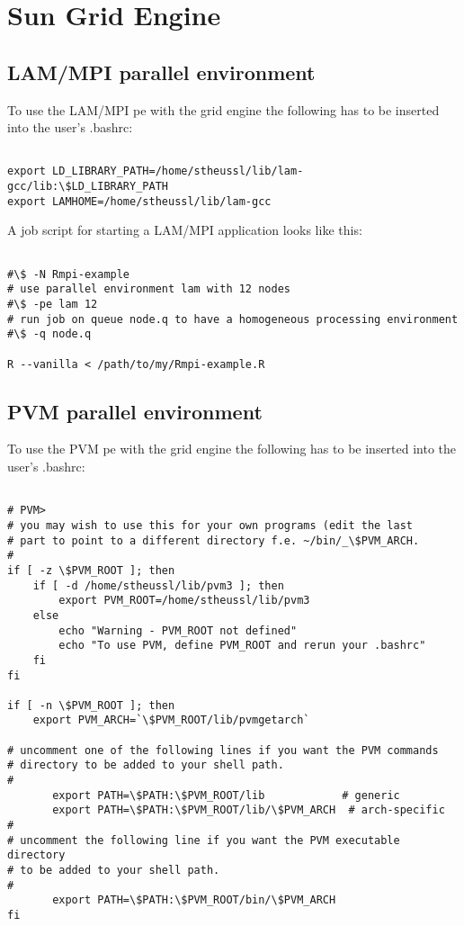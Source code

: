 
\section{Sun Grid Engine}
\label{app:gridengine}

\subsection{LAM/MPI parallel environment}

To use the LAM/MPI pe with the grid engine the following has to be
inserted into the user's .bashrc:

\begin{verbatim}

export LD_LIBRARY_PATH=/home/stheussl/lib/lam-gcc/lib:\$LD_LIBRARY_PATH
export LAMHOME=/home/stheussl/lib/lam-gcc

\end{verbatim}

A job script for starting a LAM/MPI application looks like this:

\begin{verbatim}

#\$ -N Rmpi-example
# use parallel environment lam with 12 nodes
#\$ -pe lam 12
# run job on queue node.q to have a homogeneous processing environment 
#\$ -q node.q

R --vanilla < /path/to/my/Rmpi-example.R

\end{verbatim}


\subsection{PVM parallel environment}

To use the PVM pe with the grid engine the following has to be
inserted into the user's .bashrc:

\begin{verbatim}

# PVM>
# you may wish to use this for your own programs (edit the last
# part to point to a different directory f.e. ~/bin/_\$PVM_ARCH.
#
if [ -z \$PVM_ROOT ]; then
    if [ -d /home/stheussl/lib/pvm3 ]; then
        export PVM_ROOT=/home/stheussl/lib/pvm3
    else
        echo "Warning - PVM_ROOT not defined"
        echo "To use PVM, define PVM_ROOT and rerun your .bashrc"
    fi
fi

if [ -n \$PVM_ROOT ]; then
    export PVM_ARCH=`\$PVM_ROOT/lib/pvmgetarch`

# uncomment one of the following lines if you want the PVM commands
# directory to be added to your shell path.
#
       export PATH=\$PATH:\$PVM_ROOT/lib            # generic
       export PATH=\$PATH:\$PVM_ROOT/lib/\$PVM_ARCH  # arch-specific
#
# uncomment the following line if you want the PVM executable directory
# to be added to your shell path.
#
       export PATH=\$PATH:\$PVM_ROOT/bin/\$PVM_ARCH
fi

\end{verbatim}

